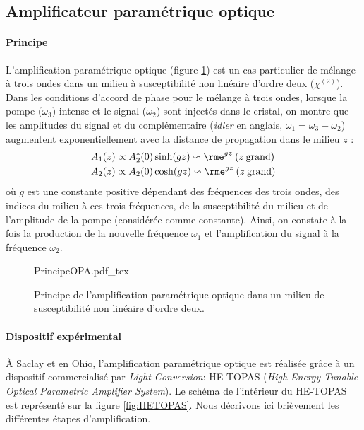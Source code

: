 \subsection{Amplificateur paramétrique optique}
\label{subsec:OPA}
\paragraph{Principe} L'amplification paramétrique optique (figure \ref{fig:PrincipeOPA}) est un cas particulier de mélange à trois ondes dans un milieu à susceptibilité non linéaire d'ordre deux ($\chi^{(2)}$). Dans les conditions d'accord de phase pour le mélange à trois ondes, lorsque la pompe ($\omega_3$) intense et le signal ($\omega_2$) sont injectés dans le cristal, on montre que les amplitudes du signal et du complémentaire (\textit{idler} en anglais, $\omega_1 = \omega_3 - \omega_2$) augmentent exponentiellement avec la distance de propagation dans le milieu $z$ :
\begin{align}
A_1(z) & \propto A_2^*(0) \sinh(gz) \backsim \rme^{gz} \: (z \: \text{grand})\\
A_2(z) & \propto A_2(0) \cosh(gz) \backsim \rme^{gz} \: (z \: \text{grand}) 
\end{align}
où $g$ est une constante positive dépendant des fréquences des trois ondes, des indices du milieu à ces trois fréquences, de la susceptibilité du milieu  et de l'amplitude de la pompe (considérée comme constante). Ainsi, on constate à la fois la production de la nouvelle fréquence $\omega_1$ et l'amplification du signal à la fréquence $\omega_2$.

\begin{figure}
\centering
\def\svgwidth{0.6\columnwidth}
{PrincipeOPA.pdf_tex}
\caption{Principe de l'amplification paramétrique optique dans un milieu de susceptibilité non linéaire d'ordre deux.}
\label{fig:PrincipeOPA}
\end{figure}

\paragraph{Dispositif expérimental} \`{A} Saclay et en Ohio, l'amplification paramétrique optique est réalisée grâce à un dispositif commercialisé par \textit{Light Conversion}: HE-TOPAS (\textit{High Energy Tunable Optical Parametric Amplifier System}). Le schéma de l'intérieur du HE-TOPAS est représenté sur la figure \ref{fig:HETOPAS}. Nous décrivons ici brièvement les différentes étapes d'amplification.

